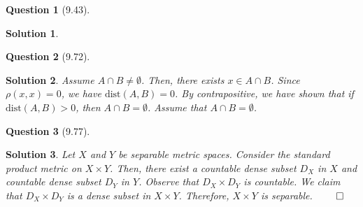 \documentclass{article} %
\theoremstyle{quest}
\newtheorem*{question}{Question}
\newtheorem*{solution}{Solution}
\begin{document}
\begin{question}[9.43]
\end{question}
\begin{solution}

\end{solution}

\bigskip

\begin{question}[9.72]
\end{question}
\begin{solution}
Assume $A \cap B \neq \emptyset$. Then, there exists $x \in A \cap B$.
Since $\rho(x,x) = 0$, we have $\text{dist}(A,B) = 0$. By contrapositive,
we have shown that if $\text{dist}(A,B) > 0$, then $A \cap B = \emptyset$.
Assume that $A \cap B = \emptyset$. 
\end{solution}

\bigskip

\begin{question}[9.77]
\end{question}
\begin{solution}
Let $X$ and $Y$ be separable metric spaces. Consider the standard
product metric on $X \times Y$. Then, there exist 
a countable dense subset $D_X$ in $X$ and countable dense 
subset $D_Y$ in $Y$. Observe that $D_X \times D_Y$ is countable. 
We claim that $D_X \times D_Y$ is a dense
subset in $X \times Y$. Therefore, $X \times Y$ is separable. $\qed$
\end{solution}
\end{document}
